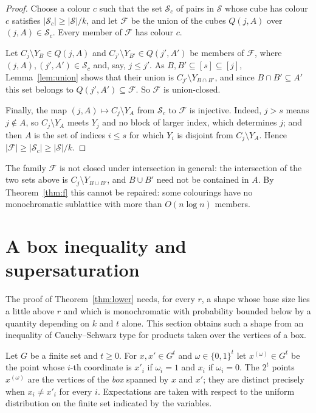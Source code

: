 \documentclass[11pt,reqno]{amsart}
\numberwithin{equation}{section}
\theoremstyle{plain}
\theoremstyle{definition}
\theoremstyle{remark}
\newcommand{\cF}{\mathcal{F}}
\newcommand{\cS}{\mathcal{S}}
\begin{document}
\begin{proof}
Choose a colour $c$ such that the set $\cS_c$ of pairs in $\cS$ whose cube
has colour $c$ satisfies $|\cS_c|\ge|\cS|/k$, and let $\cF$ be the union
of the cubes $Q(j,A)$ over $(j,A)\in\cS_c$. Every member of $\cF$ has
colour $c$.

Let $C_j\setminus Y_B\in Q(j,A)$ and $C_{j'}\setminus Y_{B'}\in Q(j',A')$
be members of $\cF$, where $(j,A),(j',A')\in\cS_c$ and, say, $j\le j'$.
As $B,B'\subseteq[s]\subseteq[j]$, Lemma~\ref{lem:union} shows that
their union is $C_{j'}\setminus Y_{B\cap B'}$, and since $B\cap
B'\subseteq A'$ this set belongs to $Q(j',A')\subseteq\cF$. So $\cF$ is
union-closed.

Finally, the map $(j,A)\mapsto C_j\setminus Y_A$ from $\cS_c$ to $\cF$ is
injective. Indeed, $j>s$ means $j\notin A$, so $C_j\setminus Y_A$ meets
$Y_j$ and no block of larger index, which determines $j$; and then $A$ is
the set of indices $i\le s$ for which $Y_i$ is disjoint from
$C_j\setminus Y_A$. Hence $|\cF|\ge|\cS_c|\ge|\cS|/k$.
\end{proof}

The family $\cF$ is not closed under intersection in general: the
intersection of the two sets above is $C_j\setminus Y_{B\cup B'}$, and
$B\cup B'$ need not be contained in $A$. By Theorem~\ref{thm:f} this
cannot be repaired: some colourings have no monochromatic sublattice with
more than $O(n\log n)$ members.

\section{A box inequality and supersaturation}
\label{sec:cube}

The proof of Theorem~\ref{thm:lower} needs, for every $r$, a shape whose
base size lies a little above $r$ and which is monochromatic with
probability bounded below by a quantity depending on $k$ and $t$ alone.
This section obtains such a shape from an inequality of Cauchy--Schwarz
type for products taken over the vertices of a box.

Let $G$ be a finite set and $t\ge0$. For $x,x'\in G^{t}$ and
$\omega\in\{0,1\}^{t}$ let $x^{(\omega)}\in G^{t}$ be the point whose
$i$-th coordinate is $x'_i$ if $\omega_i=1$ and $x_i$ if $\omega_i=0$. The
$2^{t}$ points $x^{(\omega)}$ are the vertices of the \emph{box} spanned by
$x$ and $x'$; they are distinct precisely when $x_i\ne x'_i$ for every
$i$. Expectations are taken with respect to the uniform distribution on
the finite set indicated by the variables.
\end{document}
